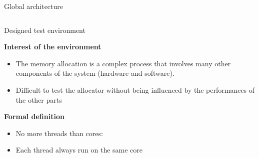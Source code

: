 \documentclass[final]{beamer}
\newlength{\onecolwid}
\newlength{\twocolwid}
\begin{document}
\begin{frame}[t]
\begin{columns}[t]
\begin{column}{\twocolwid}
\begin{columns}[t,totalwidth=\twocolwid]
\begin{column}{\onecolwid}
\begin{block}{Global architecture}
\end{block}


\end{column} %

\end{columns} %



\begin{alertblock}{Designed test environment}
\begin{minipage}{0.4\textwidth}
	\textbf{Interest of the environment}
  \begin{itemize}
		\item The memory allocation is a complex process that involves many other components of the system (hardware and software).
        \item Difficult to test the allocator without being influenced by the performances of the other parts
  \end{itemize}
\end{minipage}
\hspace{0.1\textwidth}
\begin{minipage}{0.4\textwidth}
	\textbf{Formal definition}
  \begin{itemize}
      \item No more threads than cores:
      \item Each thread always run on the same core
  \end{itemize}
\end{minipage}

\end{alertblock} 


\begin{columns}[t,totalwidth=\twocolwid] %


\end{columns}
\end{column}
\end{columns}
\end{frame}
\end{document}
